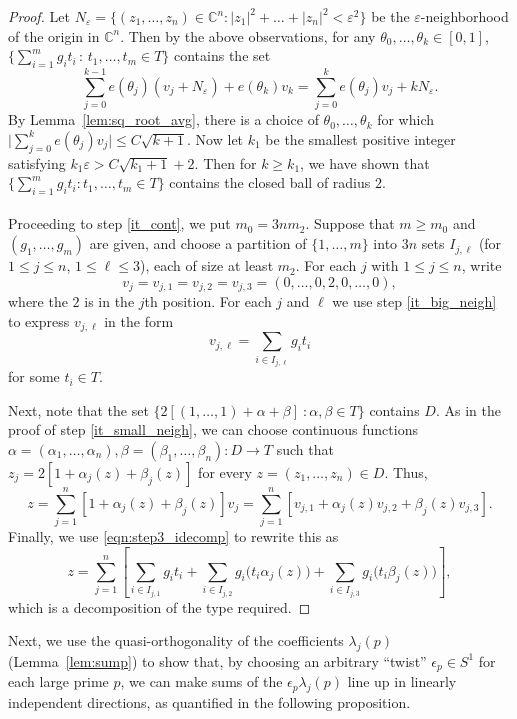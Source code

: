\documentclass[11pt]{amsart}
\theoremstyle{remark}
\numberwithin{theorem}{section}
\numberwithin{equation}{section}
\newcommand{\C}{\mathbb{C}}
\begin{document}
\begin{proof}
Let
$N_\varepsilon=\{(z_1,\ldots,z_n)\in\C^n:|z_1|^2+\ldots+|z_n|^2<\varepsilon^2\}$
be the $\varepsilon$-neighborhood of the origin in $\C^n$. Then by the
above observations, for any $\theta_0,\ldots,\theta_k\in[0,1]$,
$\big\{ \sum_{i = 1}^m g_i t_i \, : \, t_1,\ldots,t_m \in T \big\}$
contains the set
$$
\sum_{j=0}^{k-1}e( \theta_j)(v_j+N_{\varepsilon})+e(\theta_k)v_k
=\sum_{j=0}^ke(\theta_j)v_j+kN_{\varepsilon}.
$$
By Lemma~\ref{lem:sq_root_avg}, there is a choice of
$\theta_0,\ldots,\theta_k$ for which
$\bigl|\sum_{j=0}^ke(\theta_j)v_j\bigr|\le C\sqrt{k+1}$.
Now let $k_1$ be the smallest positive integer satisfying
$k_1\varepsilon > C \sqrt{k_1 + 1} + 2$. Then for $k\ge k_1$, we have
shown that $\{ \sum_{i = 1}^m g_i t_i : t_1,\ldots,t_m\in T \}$
contains the closed ball of radius $2$.
\\
\\
Proceeding to step \eqref{it_cont}, we put $m_0=3nm_2$. Suppose that 
$m\geq m_0$ and $(g_1,\dots,g_m)$ are given, and choose a partition
of $\{1,\ldots,m\}$ into $3n$
sets $I_{j,\ell}$ (for $1\leq j\leq n$, $1\leq \ell\leq3$),
each of size at least $m_2$.
For each $j$ with $1\leq j\leq n$, write
\[
v_j = v_{j,1} = v_{j,2} = v_{j,3} = (0,\ldots,0,2,0,\ldots,0),
\]
where the $2$ is in the $j$th position. For each $j$ and $\ell$ we use
step \eqref{it_big_neigh} to express $v_{j,\ell}$ in the form
\begin{equation}\label{eqn:step3_idecomp}
v_{j,\ell} = \sum_{i\in I_{j,\ell}}g_i t_i
\end{equation}
for some $t_i\in T$.

Next, note that the set
$\bigl\{2[(1,\ldots,1)+\alpha+\beta]\ : \alpha,\beta\in T\}$
contains $D$. As in the proof of step \eqref{it_small_neigh},
we can choose continuous functions
$\alpha=(\alpha_1,\ldots,\alpha_n), \beta=(\beta_1,\ldots,\beta_n):D\to T$
such that
$z_j=2[1+\alpha_j(z)+\beta_j(z)]$ for every $z=(z_1,\ldots,z_n)\in D$.
Thus,
$$
z=\sum_{j=1}^n[1+\alpha_j(z)+\beta_j(z)]v_j
=\sum_{j=1}^n [v_{j,1}+\alpha_j(z)v_{j,2}+\beta_j(z)v_{j,3}].
$$
Finally, we use \eqref{eqn:step3_idecomp} to rewrite this as
$$
z=\sum_{j=1}^n\left[
\sum_{i\in I_{j,1}}g_it_i 
+\sum_{i\in I_{j,2}}g_i\big(t_i\alpha_j(z)\big)
+\sum_{i\in I_{j,3}}g_i\big(t_i\beta_j(z)\big)\right],
$$
which is a decomposition of the type required.
\end{proof}

Next, we use the quasi-orthogonality of the coefficients $\lambda_j(p)$
(Lemma~\ref{lem:sump}) to show that, by choosing an arbitrary ``twist''
$\epsilon_p\in S^1$ for each large prime $p$, we can make sums of the
$\epsilon_p\lambda_j(p)$ line up in linearly independent directions,
as quantified in the following proposition.
\end{document}
